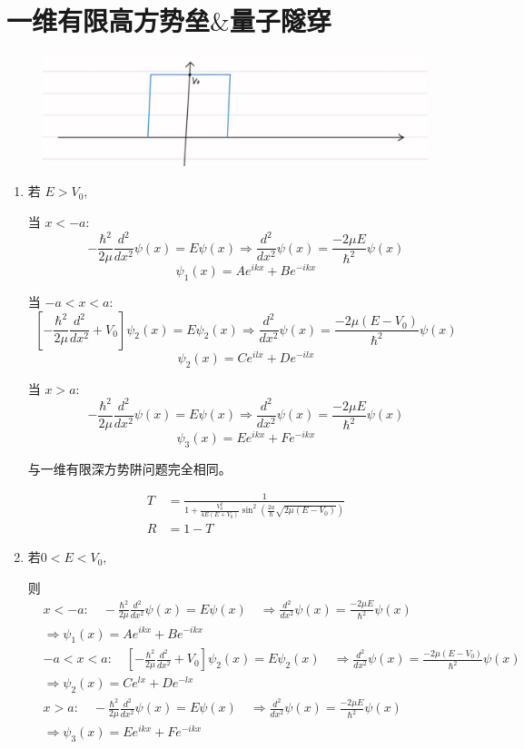 \documentclass[lang=cn,10pt]{elegantbook}
\begin{document}
\section{一维有限高方势垒$\&$量子隧穿}
\begin{figure}[H]
	\centering
	\includegraphics[width=0.7\linewidth]{figure/screenshot0027}
\end{figure}
\begin{enumerate}
	\item 若 $E > V_0$,
	
	当 $x < -a$:
	\[
	-\frac{\hbar^2}{2\mu} \frac{d^2}{dx^2} \psi(x) = E \psi(x) \Rightarrow \frac{d^2}{dx^2} \psi(x) = \frac{-2\mu E}{\hbar^2} \psi(x)
	\]
	\[
	\psi_1(x) = A e^{ikx} + B e^{-ikx}
	\]
	
	当 $-a < x < a$:
	\[
	\left[ -\frac{\hbar^2}{2\mu} \frac{d^2}{dx^2} + V_0 \right] \psi_2(x) = E \psi_2(x) \Rightarrow \frac{d^2}{dx^2} \psi(x) = \frac{-2\mu(E - V_0)}{\hbar^2} \psi(x)
	\]
	\[
	\psi_2(x) = C e^{ilx} + D e^{-ilx}
	\]
	
	当 $x > a$:
	\[
	-\frac{\hbar^2}{2\mu} \frac{d^2}{dx^2} \psi(x) = E \psi(x) \Rightarrow \frac{d^2}{dx^2} \psi(x) = \frac{-2\mu E}{\hbar^2} \psi(x)
	\]
	\[
	\psi_3(x) = E e^{ikx} + F e^{-ikx}
	\]
	
	与一维有限深方势阱问题完全相同。
	
	\begin{align*}
		T &= \frac{1}{1 + \frac{V_0^2}{4E(E + V_0)} \sin^2\left(\frac{2a}{\hbar} \sqrt{2\mu(E - V_0)}\right)} \\
		R &= 1 - T
	\end{align*}
	
	\item 若$0 < E < V_0$,
	
	则
	\begin{align*}
		& x < -a: \quad -\frac{\hbar^2}{2\mu} \frac{d^2}{dx^2} \psi(x) = E \psi(x) \quad \Rightarrow \frac{d^2}{dx^2} \psi(x) = \frac{-2\mu E}{\hbar^2} \psi(x) \\
		& \Rightarrow \psi_1(x) = A e^{ikx} + B e^{-ikx} \\
		& -a < x < a: \quad \left[ -\frac{\hbar^2}{2\mu} \frac{d^2}{dx^2} + V_0 \right] \psi_2(x) = E \psi_2(x) \quad \Rightarrow \frac{d^2}{dx^2} \psi(x) = \frac{-2\mu(E - V_0)}{\hbar^2} \psi(x) \\
		& \Rightarrow \psi_2(x) = C e^{lx} + D e^{-lx} \\
		& x > a: \quad -\frac{\hbar^2}{2\mu} \frac{d^2}{dx^2} \psi(x) = E \psi(x) \quad \Rightarrow \frac{d^2}{dx^2} \psi(x) = \frac{-2\mu E}{\hbar^2} \psi(x) \\
		& \Rightarrow \psi_3(x) = E e^{ikx} + F e^{-ikx}
	\end{align*}
	

\end{enumerate}
\end{document}
